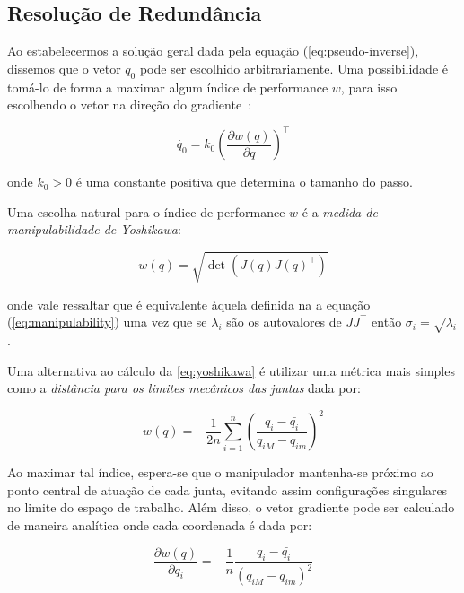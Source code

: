 \subsection{Resolução de Redundância}

Ao estabelecermos a solução geral dada pela equação (\ref{eq:pseudo-inverse}),
dissemos que o vetor \(\dot{q_0}\) pode ser escolhido arbitrariamente. Uma
possibilidade é tomá-lo de forma a maximar algum índice de performance \(w\),
para isso escolhendo o vetor na direção do gradiente~\cite[p. 126 -- 127]{siciliano_robotics_2009}:

\begin{equation}\label{eq:metric-gradient}
    \dot{q_0} = k_0 {\left( \frac{\partial w(q)}{\partial q} \right)}^\top
\end{equation}

onde \(k_0 > 0\) é uma constante positiva que determina o tamanho do passo.

Uma escolha natural para o índice de performance \(w\) é a \emph{medida de
    manipulabilidade de Yoshikawa}:

\begin{equation}\label{eq:yoshikawa}
    w(q) = \sqrt{\det(J(q){J(q)}^\top)}
\end{equation}

onde vale ressaltar que é equivalente àquela definida na a equação
(\ref{eq:manipulability}) uma vez que se \(\lambda_i\) são os autovalores de
\(J J^\top\) então \(\sigma_i = \sqrt{\lambda_i}\).

Uma alternativa ao cálculo da \ref{eq:yoshikawa} é utilizar uma métrica mais simples como a
\emph{distância para os limites mecânicos das juntas} dada por:

\begin{equation}
    w(q) = -\frac{1}{2n} \sum_{i=1}^{n}{{\left(\frac{q_i - \bar{q_i}}{q_{iM} - q_{im}}\right)}^2}
\end{equation}

Ao maximar tal índice, espera-se que o manipulador mantenha-se próximo ao ponto
central de atuação de cada junta, evitando assim configurações singulares no
limite do espaço de trabalho. Além disso, o vetor gradiente pode ser calculado
de maneira analítica onde cada coordenada é dada por:

\begin{equation}\label{eq:joint-distance-grad}
    \frac{\partial w(q)}{\partial q_i} = -\frac{1}{n} \frac{q_i - \bar{q_i}}{{(q_{iM} - q_{im})}^2}
\end{equation}


